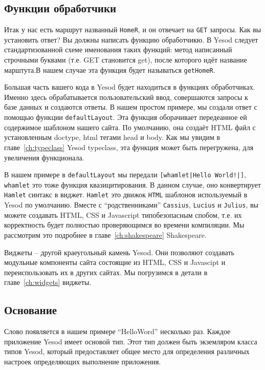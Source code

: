 \subsection{Функции обработчики}

Итак у нас есть маршрут названный \texttt{HomeR}, и он отвечает на \texttt{GET} запросы. 
Как вы установить ответ? Вы должны написать функцию обработчикю. В Yesod следует
стандартизованной схеме именования таких функций: 
метод написанный строчными буквами (т.е. GET становится get), после которого идёт 
название марштута.В нашем случае эта функция будет называться \lstinline'getHomeR'.

Большая часть вашего кода в Yesod будет находиться в функциях обработчиках. 
Именно здесь обрабатывается пользовательский ввод, совершаются запросы к базе данных и создаются ответы. 
В нашем простом примере, мы создали ответ с помощью функции \lstinline'defaultLayout'. 
Эта функция оборачивает передеанное ей содержимое шаблоном нашего сайта. 
По умолчанию, она создаёт HTML файл с установленным doctype, html тегами head и body. 
Как мы увидим в главе~\ref{ch:typeclass} Yesod typeclass, эта функция может быть перегружена,
для увеличения функционала.

В нашем примере в \lstinline'defaultLayout' мы передали \lstinline'[whamlet|Hello World!|]', 
\lstinline'whamlet' это тоже функция квазицитирования. В данном случае, оно конвертирует 
\texttt{Hamlet} синтакс в виджет. \texttt{Hamlet} это движок \texttt{HTML} шаблонов используемый
в Yesod по умолчанию. Вместе с ``родственниками'' \texttt{Cassius}, \texttt{Lucius} и \texttt{Julius}, 
вы можете создавать HTML, CSS и Javascript типобезопасным спобом, т.е. 
их корректность будет полностью проверяющимся во времени компиляции. Мы рассмотрим это подробнее в 
главе~\ref{ch:shakespeare} Shakespeare.

Виджеты -- другой краеугольный камень Yesod. Они позволяют создавать модульные компоненты сайта 
состоящие из HTML, CSS и Javascipt и переиспользовать их в других сайтах. Мы погрузимся в детали
в главе~\ref{ch:widgets} виджеты.

\subsection{Основание}

Слово появляется в нашем примере ``HelloWord'' несколько раз. Каждое приложение 
Yesod имеет основой тип. Этот тип должен быть экземляром класса типов Yesod, 
который предоставляет общее место для определения различных настроек определяющих 
выполнение приложения.

